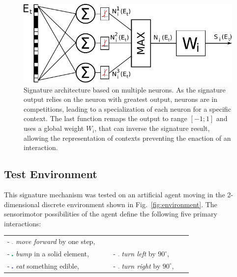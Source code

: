 \documentclass[conference]{IEEEtran}
\begin{document}
\begin{figure}[htbp]
\centerline{\includegraphics[scale=0.55]{img/signature_model2.pdf}}
\caption{Signature architecture based on multiple neurons. As the signature output relies on the neuron with greatest output, neurons are in competitions, leading to a specialization of each neuron for a specific context. The last function remaps the output to range $[-1;1]$ and uses a global weight $W_i$, that can inverse the signature result, allowing the representation of contexts preventing the enaction of an interaction.}
\label{fig:neuron}
\end{figure}

\subsection{Test Environment}\label{implementation}

This signature mechanism was tested on an artificial agent moving in the 2-dimensional discrete environment shown in Fig.~\ref{fig:environment}.
The sensorimotor possibilities of the agent define the following five primary interactions:

 \begin{tabular}{ l l }
   - \includegraphics[width=0.015\textwidth]{img/mf0.pdf} \textit{move forward} by one step, \\
   - \includegraphics[width=0.015\textwidth]{img/mf1.pdf} \textit{bump} in a solid element, &
   - \includegraphics[width=0.02\textwidth]{img/lt0.pdf} \textit{turn left} by $90^\circ$, \\
   - \includegraphics[width=0.015\textwidth]{img/mf2.pdf} \textit{eat} something edible, &
   - \includegraphics[width=0.02\textwidth]{img/rt0.pdf} \textit{turn right} by $90^\circ$, \\
 \end{tabular}
\end{document}
